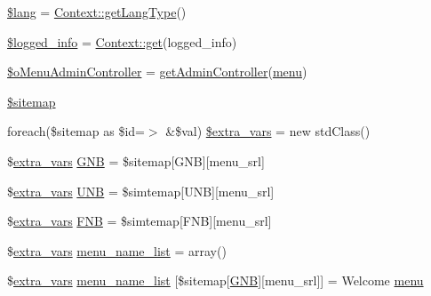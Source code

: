 \begin{DoxyCompactItemize}
\item 
\hyperlink{ko_8install_8php_a7714b111b644017933931ec69a154102}{\$lang} = \hyperlink{classContext_ae75d6f4064d09e48d0d76614b6997e29}{Context\+::get\+Lang\+Type}()
\item 
\hyperlink{ko_8install_8php_a193c1593ceb216e9fb05b0bad01ebbc8}{\$logged\+\_\+info} = \hyperlink{classContext_a90ce25d65fe6c9778421cbb36ab3def5}{Context\+::get}(\textquotesingle{}logged\+\_\+info\textquotesingle{})
\item 
\hyperlink{ko_8install_8php_a9062530c3b03479ca4530daee1c18887}{\$o\+Menu\+Admin\+Controller} = \hyperlink{func_8inc_8php_a2f7ca88a5226536aca3b2f5682bd7b2d}{get\+Admin\+Controller}(\textquotesingle{}\hyperlink{classmenu}{menu}\textquotesingle{})
\item 
\hyperlink{ko_8install_8php_ae7b8fee391a6d8b9162de5b69b9dc07f}{\$sitemap}
\item 
foreach(\$sitemap as \$id=$>$ \&\$val) \hyperlink{ko_8install_8php_a99863a9d4b597491e1a9c801f2e55c0b}{\$extra\+\_\+vars} = new std\+Class()
\item 
\$\hyperlink{ko_8install_8php_ae1dcb37fc34a8f312d2e6abd6f806743}{extra\+\_\+vars} \hyperlink{ko_8install_8php_a9b1716b68fc04f3492448f38148dcbf5}{G\+N\+B} = \$sitemap\mbox{[}\textquotesingle{}G\+N\+B\textquotesingle{}\mbox{]}\mbox{[}\textquotesingle{}menu\+\_\+srl\textquotesingle{}\mbox{]}
\item 
\$\hyperlink{ko_8install_8php_ae1dcb37fc34a8f312d2e6abd6f806743}{extra\+\_\+vars} \hyperlink{ko_8install_8php_abc0cb1f57d83d4a106f4495c30e0df52}{U\+N\+B} = \$simtemap\mbox{[}\textquotesingle{}U\+N\+B\textquotesingle{}\mbox{]}\mbox{[}\textquotesingle{}menu\+\_\+srl\textquotesingle{}\mbox{]}
\item 
\$\hyperlink{ko_8install_8php_ae1dcb37fc34a8f312d2e6abd6f806743}{extra\+\_\+vars} \hyperlink{ko_8install_8php_a683e060c22be3e658be6f9751a2082f0}{F\+N\+B} = \$simtemap\mbox{[}\textquotesingle{}F\+N\+B\textquotesingle{}\mbox{]}\mbox{[}\textquotesingle{}menu\+\_\+srl\textquotesingle{}\mbox{]}
\item 
\$\hyperlink{ko_8install_8php_ae1dcb37fc34a8f312d2e6abd6f806743}{extra\+\_\+vars} \hyperlink{ko_8install_8php_a9223cf55eb6ff5239c0396968e619fbe}{menu\+\_\+name\+\_\+list} = array()
\item 
\$\hyperlink{ko_8install_8php_ae1dcb37fc34a8f312d2e6abd6f806743}{extra\+\_\+vars} \hyperlink{ko_8install_8php_a5e00e121a1038ef3c304b7f78488d102}{menu\+\_\+name\+\_\+list} \mbox{[}\$sitemap\mbox{[}\textquotesingle{}\hyperlink{ko_8install_8php_a9b1716b68fc04f3492448f38148dcbf5}{G\+N\+B}\textquotesingle{}\mbox{]}\mbox{[}\textquotesingle{}menu\+\_\+srl\textquotesingle{}\mbox{]}\mbox{]} = \textquotesingle{}Welcome \hyperlink{classmenu}{menu}\textquotesingle{}

\end{DoxyCompactItemize}
